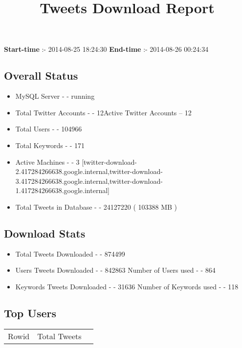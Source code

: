 \documentclass{article}\usepackage[T1]{fontenc}
\begin{document}
\title{\textbf{Tweets Download Report}}
               \date{}
                \maketitle
               \centerline{\textbf{Start-time} :- 2014-08-25 18:24:30 \hspace{40pt} \textbf{End-time} :- 2014-08-26 00:24:34}               \subsection*{Overall Status}                \begin{itemize}                \item MySQL Server - - running               \item Total Twitter Accounts - - 12\newline Active Twitter Accounts -- 12               \item Total Users - - 104966               \item Total Keywords - - 171               \item Active Machines - - 3 [twitter-download-2.417284266638.google.internal,twitter-download-3.417284266638.google.internal,twitter-download-1.417284266638.google.internal]               \item Total Tweets in Database - - 24127220 ( 103388 MB )               \end{itemize}               \subsection*{Download Stats}                \begin{itemize}                \item Total Tweets Downloaded - - 874499               \item Users Tweets Downloaded - - 842863 \newline Number of Users used - - 864               \item Keywords Tweets Downloaded - - 31636 \newline Number of Keywords used - - 118              \end{itemize}              \subsection*{Top Users}\begin{tabular}{|c|c|c|}         \hline         Rowid & Total Tweets \\ 

\end{tabular}
\end{document}
